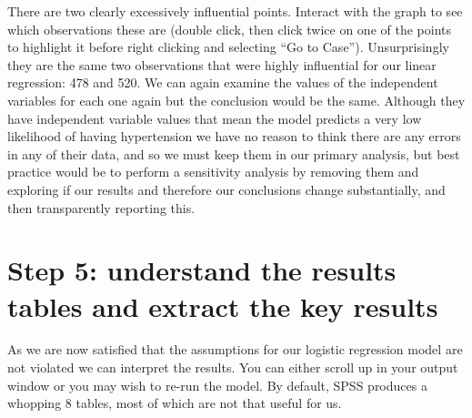 \documentclass[
]{book}
\begin{document}
There are two clearly excessively influential points. Interact with the graph to see which observations these are (double click, then click twice on one of the points to highlight it before right clicking and selecting ``Go to Case''). Unsurprisingly they are the same two observations that were highly influential for our linear regression: 478 and 520. We can again examine the values of the independent variables for each one again but the conclusion would be the same. Although they have independent variable values that mean the model predicts a very low likelihood of having hypertension we have no reason to think there are any errors in any of their data, and so we must keep them in our primary analysis, but best practice would be to perform a sensitivity analysis by removing them and exploring if our results and therefore our conclusions change substantially, and then transparently reporting this.

\hypertarget{step-5-understand-the-results-tables-and-extract-the-key-results-1}{%
\section{Step 5: understand the results tables and extract the key results}\label{step-5-understand-the-results-tables-and-extract-the-key-results-1}}

As we are now satisfied that the assumptions for our logistic regression model are not violated we can interpret the results. You can either scroll up in your output window or you may wish to re-run the model. By default, SPSS produces a whopping 8 tables, most of which are not that useful for us.
\end{document}
